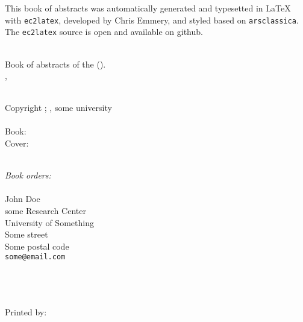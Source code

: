 \pagestyle{empty}

\strut
\vfill

\bigskip
\noindent
This book of abstracts was automatically generated and typesetted in \LaTeX{} with \texttt{ec2latex}, developed by Chris Emmery, and styled based on \texttt{arsclassica}. The
\texttt{ec2latex} source is open and available on github.\\ \\

\smallskip

\noindent Book of abstracts of the \confName{} (\confAbr). \vspace{0.3cm} \\
\noindent \confLoc, \confOrg \\ \\

\bigskip

\noindent \textcopyright{} Copyright \the\year; \confOrg, some university \\ \\
\begingroup
\footnotesize
Book: \confAuth \\
Cover: \confCover \\ \\
\endgroup

\bigskip

\noindent \emph{Book orders:} \\ \\
John Doe \\
some Research Center \\
University of Something \\
Some street \\
Some postal code \\
\texttt{some@email.com} \\ \\ \\ \\

\bigskip

\noindent Printed by: \confBind
\newpage